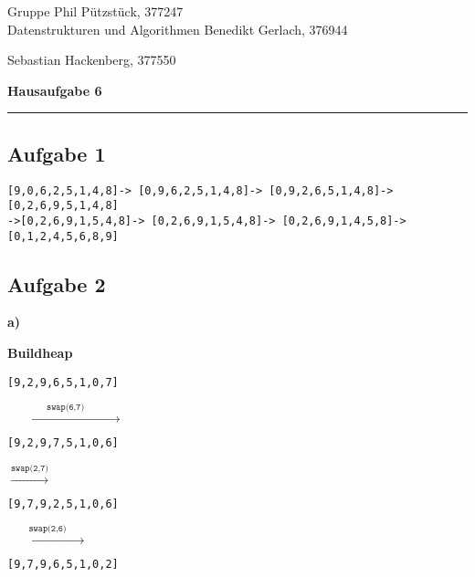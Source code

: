 \documentclass[a4paper,graphics,11pt]{article}
\newcommand{\aufgabe}[1]{\subsection*{Aufgabe #1}}
\begin{document}
\noindent Gruppe              \hfill Phil Pützstück, 377247\\
\noindent Datenstrukturen und Algorithmen \hfill Benedikt Gerlach, 376944\\
\strut\hfill Sebastian Hackenberg, 377550\\
\begin{center}
	\LARGE{\textbf{Hausaufgabe 6}}
\end{center}
\begin{center}
\rule[0.1ex]{\textwidth}{1pt}
\end{center}

\aufgabe{1}
\texttt{[9,0,6,2,5,1,4,8]->
[0,9,6,2,5,1,4,8]->
[0,9,2,6,5,1,4,8]->
[0,2,6,9,5,1,4,8]}
\\
\texttt{->[0,2,6,9,1,5,4,8]->
[0,2,6,9,1,5,4,8]->
[0,2,6,9,1,4,5,8]->
[0,1,2,4,5,6,8,9]}

\aufgabe{2}
\textbf{a)}

\textbf{Buildheap}

\begin{minipage}{0.3\textwidth}
    \texttt{[9,2,9,6,5,1,0,7]}
\end{minipage}
$\xrightarrow{\qquad\qquad\texttt{swap(6,7)}\qquad\qquad}$
\begin{minipage}{0.3\textwidth}
    \texttt{[9,2,9,7,5,1,0,6]}
\end{minipage}

$\xrightarrow{\texttt{swap(2,7)}}$
\begin{minipage}{0.3\textwidth}
    \texttt{[9,7,9,2,5,1,0,6]}
\end{minipage}
$\xrightarrow{\qquad\texttt{swap(2,6)}\qquad}$
\begin{minipage}{0.3\textwidth}
    \texttt{[9,7,9,6,5,1,0,2]}
\end{minipage}
\newpage
\end{document}
